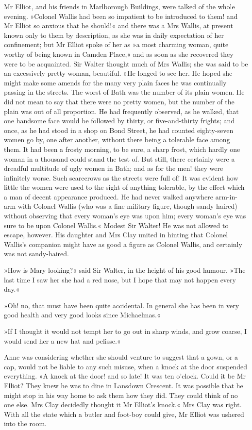 Mr Elliot, and his friends in Marlborough Buildings, were talked of the whole evening. »Colonel Wallis had been so impatient to be introduced to them! and Mr Elliot so anxious that he should!« and there was a Mrs Wallis, at present known only to them by description, as she was in daily expectation of her confinement; but Mr Elliot spoke of her as »a most charming woman, quite worthy of being known in Camden Place,« and as soon as she recovered they were to be acquainted. Sir Walter thought much of Mrs Wallis; she was said to be an excessively pretty woman, beautiful. »He longed to see her. He hoped she might make some amends for the many very plain faces he was continually passing in the streets. The worst of Bath was the number of its plain women. He did not mean to say that there were no pretty women, but the number of the plain was out of all proportion. He had frequently observed, as he walked, that one handsome face would be followed by thirty, or five-and-thirty frights; and once, as he had stood in a shop on Bond Street, he had counted eighty-seven women go by, one after another, without there being a tolerable face among them. It had been a frosty morning, to be sure, a sharp frost, which hardly one woman in a thousand could stand the test of. But still, there certainly were a dreadful multitude of ugly women in Bath; and as for the men! they were infinitely worse. Such scarecrows as the streets were full of! It was evident how little the women were used to the sight of anything tolerable, by the effect which a man of decent appearance produced. He had never walked anywhere arm-in-arm with Colonel Wallis (who was a fine military figure, though sandy-haired) without observing that every woman's eye was upon him; every woman's eye was sure to be upon Colonel Wallis.« Modest Sir Walter! He was not allowed to escape, however. His daughter and Mrs Clay united in hinting that Colonel Wallis's companion might have as good a figure as Colonel Wallis, and certainly was not sandy-haired.

»How is Mary looking?« said Sir Walter, in the height of his good humour. »The last time I saw her she had a red nose, but I hope that may not happen every day.«

»Oh! no, that must have been quite accidental. In general she has been in very good health and very good looks since Michaelmas.«

»If I thought it would not tempt her to go out in sharp winds, and grow coarse, I would send her a new hat and pelisse.«

Anne was considering whether she should venture to suggest that a gown, or a cap, would not be liable to any such misuse, when a knock at the door suspended everything. »A knock at the door! and so late! It was ten o'clock. Could it be Mr Elliot? They knew he was to dine in Lansdown Crescent. It was possible that he might stop in his way home to ask them how they did. They could think of no one else. Mrs Clay decidedly thought it Mr Elliot's knock.« Mrs Clay was right. With all the state which a butler and foot-boy could give, Mr Elliot was ushered into the room.

